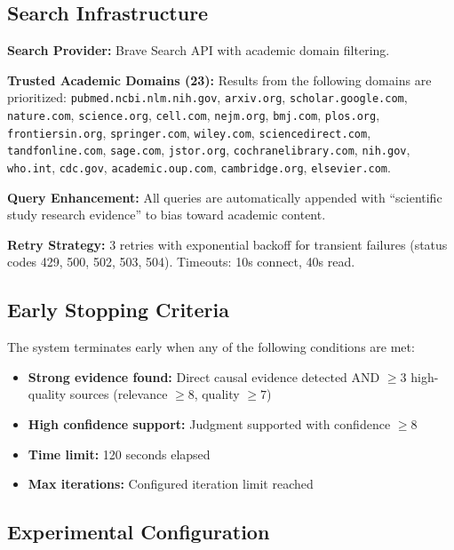 \subsection{Search Infrastructure}

\textbf{Search Provider:} Brave Search API with academic domain filtering.

\textbf{Trusted Academic Domains (23):} Results from the following domains are prioritized: \texttt{pubmed.ncbi.nlm.nih.gov}, \texttt{arxiv.org}, \texttt{scholar.google.com}, \texttt{nature.com}, \texttt{science.org}, \texttt{cell.com}, \texttt{nejm.org}, \texttt{bmj.com}, \texttt{plos.org}, \texttt{frontiersin.org}, \texttt{springer.com}, \texttt{wiley.com}, \texttt{sciencedirect.com}, \texttt{tandfonline.com}, \texttt{sage.com}, \texttt{jstor.org}, \texttt{cochranelibrary.com}, \texttt{nih.gov}, \texttt{who.int}, \texttt{cdc.gov}, \texttt{academic.oup.com}, \texttt{cambridge.org}, \texttt{elsevier.com}.

\textbf{Query Enhancement:} All queries are automatically appended with ``scientific study research evidence'' to bias toward academic content.

\textbf{Retry Strategy:} 3 retries with exponential backoff for transient failures (status codes 429, 500, 502, 503, 504). Timeouts: 10s connect, 40s read.

\subsection{Early Stopping Criteria}

The system terminates early when any of the following conditions are met:
\begin{itemize}[noitemsep]
    \item \textbf{Strong evidence found:} Direct causal evidence detected AND $\geq$3 high-quality sources (relevance $\geq 8$, quality $\geq 7$)
    \item \textbf{High confidence support:} Judgment supported with confidence $\geq 8$
    \item \textbf{Time limit:} 120 seconds elapsed
    \item \textbf{Max iterations:} Configured iteration limit reached
\end{itemize}

\subsection{Experimental Configuration}

